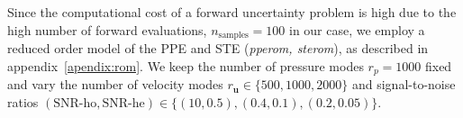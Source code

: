 Since the computational cost of a forward uncertainty problem is high due to the high number of forward evaluations, $n_{\text{samples}}=100$ in our case, we employ a reduced order model of the PPE and STE (\textit{pperom, sterom}), as described in appendix~\ref{apendix:rom}. We keep the number of pressure modes $r_p=1000$ fixed and vary the number of velocity modes $r_{\mathbf u}\in\{500, 1000, 2000\}$ and signal-to-noise ratios $(\text{SNR-ho}, \text{SNR-he})\in \{(10, 0.5), (0.4, 0.1), (0.2, 0.05)\}$.
